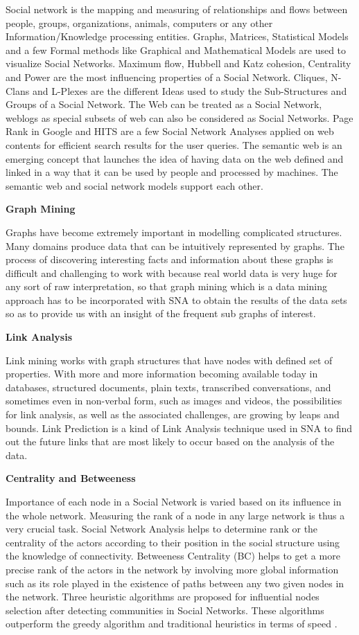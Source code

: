 Social network is the mapping and measuring of relationships and flows between people, groups, organizations, animals, computers or any other Information/Knowledge processing entities. Graphs, Matrices, Statistical Models and a few Formal methods like Graphical and Mathematical Models are used to visualize Social Networks. Maximum flow, Hubbell and Katz cohesion, Centrality and Power are the most influencing properties of a Social Network. Cliques, N-Clans and L-Plexes are the different Ideas used to study the Sub-Structures and Groups of a Social Network. The Web can be treated as a Social Network, weblogs as special subsets of web can also be considered as Social Networks. Page Rank in Google and HITS are a few Social Network Analyses applied on web contents for efficient search results for the user queries. The semantic web is an emerging concept that launches the idea of having data on the web defined and linked in a way that it can be used by people and processed by machines. The semantic web and social network models support each other.

{\bf Graph Mining}

Graphs have become extremely important in modelling complicated structures. Many domains produce data that can be intuitively represented by graphs. The process of discovering interesting facts and information about these graphs is difficult and challenging to work with because real world data is very huge for any sort of raw interpretation, so that graph mining which is a data mining approach has to be incorporated with SNA to obtain the results of the data sets so as to provide us with an insight of the frequent sub graphs of interest.

{\bf Link Analysis}

Link mining works with graph structures that have nodes with defined set of properties. With more and more information becoming available today in databases, structured documents, plain texts, transcribed conversations, and sometimes even in non-verbal form, such as images and videos, the possibilities for link analysis, as well as the associated challenges, are growing by leaps and bounds. Link Prediction is a kind of Link Analysis technique used in SNA to find out the future links that are most likely to occur based on the analysis of the data.

{\bf Centrality and Betweeness}

Importance of each node in a Social Network is varied based on its influence in the whole network. Measuring the rank of a node in any large network is thus a very crucial task. Social Network Analysis helps to determine rank or the centrality of the actors according to their position in the social structure using the knowledge of connectivity. Betweeness Centrality (BC) helps to get a more precise rank of the actors in the network by involving more global information such as its role played in the existence of paths between any two given nodes in the network. Three heuristic algorithms are proposed for influential nodes selection after detecting communities in Social Networks. These algorithms outperform the greedy algorithm and traditional heuristics in terms of speed .

